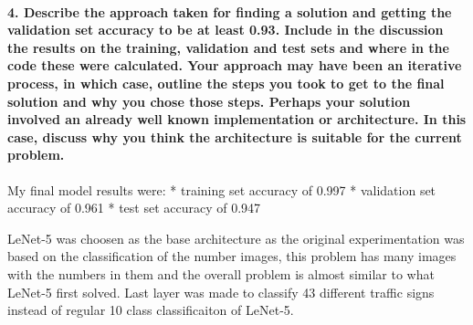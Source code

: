 \documentclass[11pt]{article}
\begin{document}
\hypertarget{describe-the-approach-taken-for-finding-a-solution-and-getting-the-validation-set-accuracy-to-be-at-least-0.93.-include-in-the-discussion-the-results-on-the-training-validation-and-test-sets-and-where-in-the-code-these-were-calculated.-your-approach-may-have-been-an-iterative-process-in-which-case-outline-the-steps-you-took-to-get-to-the-final-solution-and-why-you-chose-those-steps.-perhaps-your-solution-involved-an-already-well-known-implementation-or-architecture.-in-this-case-discuss-why-you-think-the-architecture-is-suitable-for-the-current-problem.}{%
\paragraph{4. Describe the approach taken for finding a solution and
getting the validation set accuracy to be at least 0.93. Include in the
discussion the results on the training, validation and test sets and
where in the code these were calculated. Your approach may have been an
iterative process, in which case, outline the steps you took to get to
the final solution and why you chose those steps. Perhaps your solution
involved an already well known implementation or architecture. In this
case, discuss why you think the architecture is suitable for the current
problem.}\label{describe-the-approach-taken-for-finding-a-solution-and-getting-the-validation-set-accuracy-to-be-at-least-0.93.-include-in-the-discussion-the-results-on-the-training-validation-and-test-sets-and-where-in-the-code-these-were-calculated.-your-approach-may-have-been-an-iterative-process-in-which-case-outline-the-steps-you-took-to-get-to-the-final-solution-and-why-you-chose-those-steps.-perhaps-your-solution-involved-an-already-well-known-implementation-or-architecture.-in-this-case-discuss-why-you-think-the-architecture-is-suitable-for-the-current-problem.}}

My final model results were: * training set accuracy of 0.997 *
validation set accuracy of 0.961 * test set accuracy of 0.947

LeNet-5 was choosen as the base architecture as the original
experimentation was based on the classification of the number images,
this problem has many images with the numbers in them and the overall
problem is almost similar to what LeNet-5 first solved. Last layer was
made to classify 43 different traffic signs instead of regular 10 class
classificaiton of LeNet-5.
\end{document}
